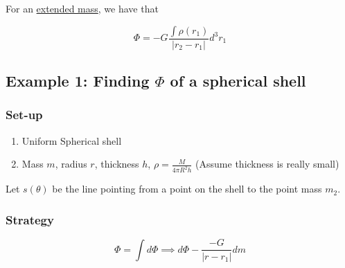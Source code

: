 \documentclass{article}
\newtheorem{one minute paper}[theorem]{One Minute Paper}
\begin{document}
For an \underline{extended mass}, we have that 

\begin{equation}
    \Phi = -G\frac{\int \rho(r_1)}{|r_2-r_1|}d^3r_1
\end{equation}

\subsection*{Example 1: Finding $\Phi$ of a spherical shell}

\subsubsection*{Set-up}
\begin{enumerate}
    \item Uniform Spherical shell
    \item Mass $m$, radius $r$, thickness $h$, $\rho = \frac{M}{4\pi R^2h}$ (Assume thickness is really small)
\end{enumerate}

Let $s(\theta)$ be the line pointing from a point on the shell to the point mass $m_2$. 

\subsubsection*{Strategy}

\begin{equation}
    \Phi = \int d\Phi \implies d\Phi - \frac{-G}{|r-r_1|}dm
\end{equation}
\end{document}
